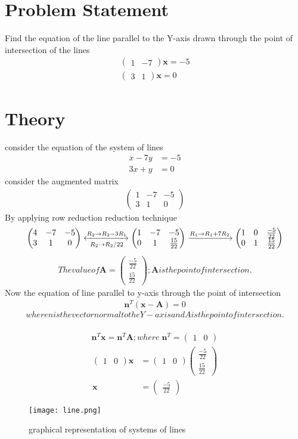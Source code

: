 \documentclass{article}
\newcommand{\A}{\textbf{A}}
\newcommand{\x}{\textbf{x}}
\newcommand{\n}{\textbf{n}}
\newcommand{\myvec}[1]{\ensuremath{\begin{pmatrix}#1\end{pmatrix}}}
\begin{document}
\section{Problem Statement}
Find the equation of the line parallel to the Y-axis drawn through the point of intersection of the lines
\begin{align}
\myvec{1 & -7}\x  =-5 \\ \myvec{3 & 1}\x = 0
\end{align}
\section{Theory}
consider the equation of the system of lines
\begin{align}
x - 7y & = -5 \\
3x + y & = 0
\end{align}
 consider the augmented matrix
 \begin{align}
 \myvec{1 & -7 & -5 \\ 3 & 1 & 0}
 \end{align}
 By applying row reduction reduction technique \\
 \begin{align}
\myvec{4 & -7 & -5\\ 3 & 1 & 0}
	\xleftrightarrow[R_2 \rightarrow R_2/22]{R_2 \rightarrow R_2-3R_1}
	\myvec{1 & -7 & -5 \\ 0 & 1 & \frac{15}{22}}
	\xrightarrow[]{R_1 \rightarrow R_1+7R_2}
	 \myvec{1 & 0 & \frac{-5}{22} \\ 0 & 1 & \frac{15}{22}}
 \end{align}
\begin{align}
The value of {\A} = \myvec{\frac{-5}{22} \\ \frac{15}{22}} ;
{\A} is the point of intersection.
\end{align}
Now the equation of line parallel to y-axis through the point of intersection\\
\begin{align}
{\n}^T({\x}-{\A}) = 0
\end{align}
$$where {n}  is the vector normal to the Y - axis and{A} is the point of intersection.$$\\
\begin{align*}
{{\n}^T{\x}} = {{\n}^T{\A}} ; where \;
{\n}^T = \myvec{1 & 0}
 \end{align*}
 \begin{align}
\myvec{1 & 0}{\x} &  = \myvec{1 & 0} \myvec{\frac{-5}{22} \\ \frac{15}{22}}\\
{\x} & = \myvec{\frac{-5}{22}} 
 \end{align}
 \begin{figure}
 \centering
 \texttt{[image: line.png]}
 \caption{graphical representation of systems of lines}
 \end{figure}
\end{document}
